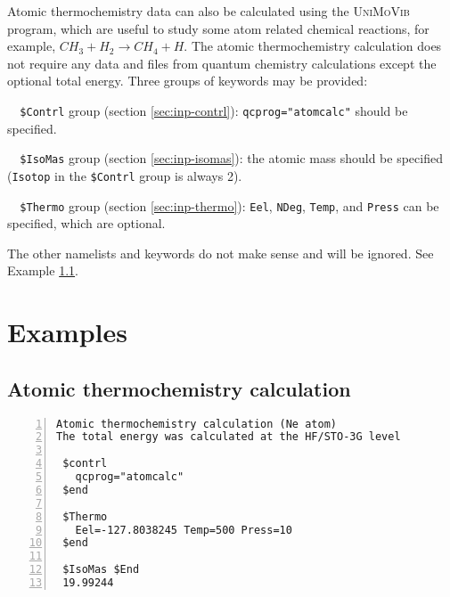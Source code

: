 \documentclass[12pt,english]{extarticle}
\begin{document}
Atomic thermochemistry data can also be calculated using the \textsc{UniMoVib} program, which are useful to
study some atom related chemical reactions, for example, $CH_3 + H_2 \rightarrow CH_4 + H$. The atomic
thermochemistry calculation does not require any data and files from quantum chemistry calculations except the
optional total energy. Three groups of keywords may be provided:

\begin{description}
\item[ ]\verb|  $Contrl| group (section \ref{sec:inp-contrl}): \verb|qcprog="atomcalc"| should be specified.
\item[ ]\verb|  $IsoMas| group (section \ref{sec:inp-isomas}): the atomic mass should be specified (\verb|Isotop| in the \verb|$Contrl| group is always 2).
\item[ ]\verb|  $Thermo| group (section \ref{sec:inp-thermo}): \verb|Eel|, \verb|NDeg|, \verb|Temp|, and \verb|Press| can be specified, which are optional.
\end{description}
The other namelists and keywords do not make sense and will be ignored. See Example \ref{sec:exp1}.

\pagebreak{}


\section{Examples} \label{part:examp}

\subsection{Atomic thermochemistry calculation} \label{sec:exp1}

\begin{Verbatim}[frame=single,label=example,labelposition=topline,numbers=left,rulecolor=\color{blue},fontsize=\footnotesize,baselinestretch=1.0]
Atomic thermochemistry calculation (Ne atom)
The total energy was calculated at the HF/STO-3G level

 $contrl
   qcprog="atomcalc"
 $end

 $Thermo
   Eel=-127.8038245 Temp=500 Press=10
 $end

 $IsoMas $End
 19.99244
\end{Verbatim}
\end{document}

